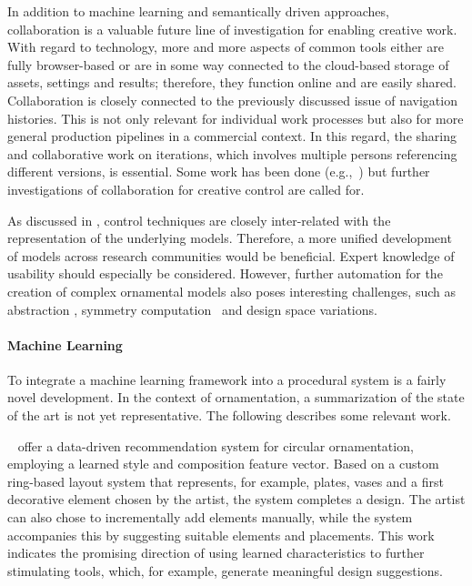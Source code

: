 In addition to machine learning and semantically driven approaches, collaboration is a valuable future line of investigation for enabling creative work. With regard to technology, more and more aspects of common tools either are fully browser-based or are in some way connected to the cloud-based storage of assets, settings and results; therefore, they function online and are easily shared. Collaboration is closely connected to the previously discussed issue of navigation histories. This is not only relevant for individual work processes but also for more general production pipelines in a commercial context. In this regard, the sharing and collaborative work on iterations, which involves multiple persons referencing different versions, is essential. Some work has been done (e.g.,~\cite{salvati_2015_mcm,oleary_2018_csi}) but further investigations of collaboration for creative control are called for. 

As discussed in , control techniques are closely inter-related with the representation of the underlying models. Therefore, a more unified development of models across research communities would be beneficial. Expert knowledge of usability should especially be considered. However, further automation for the creation of complex ornamental models also poses interesting challenges, such as abstraction \cite{nan_2011_cgr}, symmetry computation~\cite{cullen_2011_sh} and design space variations.


\paragraph{Machine Learning}
\label{subsubsec:analysis_outlook_machinelearning}

To integrate a machine learning framework into a procedural system is a fairly novel development. In the context of ornamentation, a summarization of the state of the art is not yet representative. The following describes some relevant work.

\citeauthor*{phan_2016_ple}~\cite{phan_2016_ple} offer a data-driven recommendation system for circular ornamentation, employing a learned style and composition feature vector. Based on a custom ring-based layout system that represents, for example, plates, vases and a first decorative element chosen by the artist, the system completes a design. The artist can also chose to incrementally add elements manually, while the system accompanies this by suggesting suitable elements and placements. This work indicates the promising direction of using learned characteristics to further stimulating tools, which, for example, generate meaningful design suggestions.

